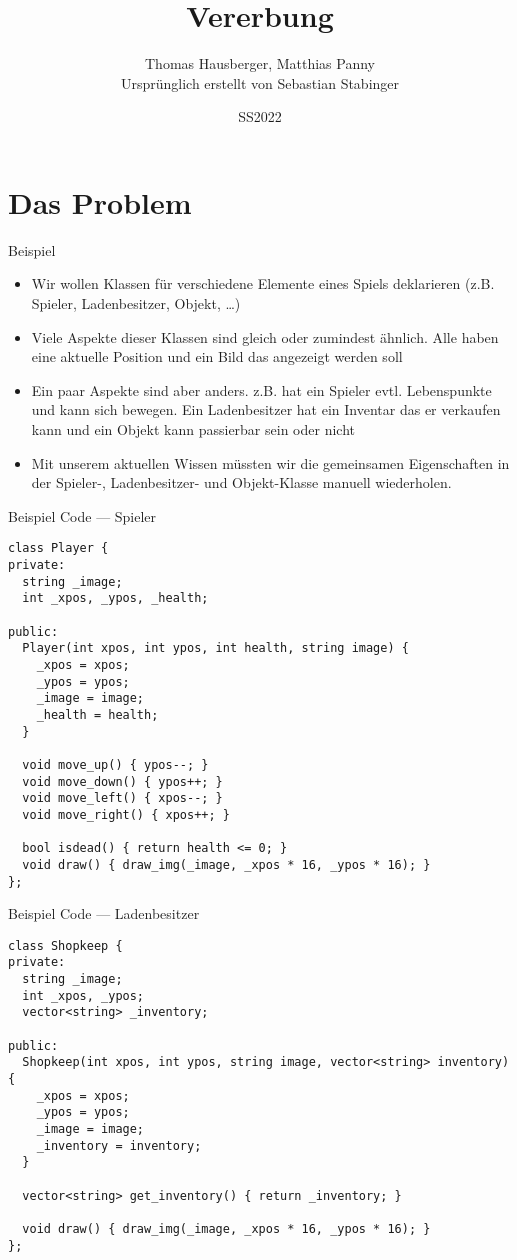 \documentclass[presentation]{beamer}
\author{Thomas Hausberger, Matthias Panny \\ Ursprünglich erstellt von Sebastian Stabinger}
\date{SS2022}
\title{Vererbung}
\begin{document}
\maketitle

\section{Das Problem}
\label{sec:orgf4ffd4a}
\begin{frame}[label={sec:org2c7cd86}]{Beispiel}
\begin{itemize}
\item Wir wollen Klassen für verschiedene Elemente eines Spiels
deklarieren (z.B. Spieler, Ladenbesitzer, Objekt, \ldots{})
\item Viele Aspekte dieser Klassen sind gleich oder zumindest ähnlich.
Alle haben eine aktuelle Position und ein Bild das angezeigt werden
soll
\item Ein paar Aspekte sind aber anders. z.B. hat ein Spieler evtl.
Lebenspunkte und kann sich bewegen. Ein Ladenbesitzer hat ein
Inventar das er verkaufen kann und ein Objekt kann passierbar sein
oder nicht
\item Mit unserem aktuellen Wissen müssten wir die gemeinsamen
Eigenschaften in der Spieler-, Ladenbesitzer- und Objekt-Klasse
manuell wiederholen.
\end{itemize}
\end{frame}
\begin{frame}[label={sec:org0486e86},fragile]{Beispiel Code --- Spieler}
 \begin{verbatim}
class Player {
private:
  string _image;
  int _xpos, _ypos, _health;

public:
  Player(int xpos, int ypos, int health, string image) {
    _xpos = xpos;
    _ypos = ypos;
    _image = image;
    _health = health;
  }

  void move_up() { ypos--; }
  void move_down() { ypos++; }
  void move_left() { xpos--; }
  void move_right() { xpos++; }

  bool isdead() { return health <= 0; }
  void draw() { draw_img(_image, _xpos * 16, _ypos * 16); }
};
\end{verbatim}
\end{frame}
\begin{frame}[label={sec:org48f000f},fragile]{Beispiel Code --- Ladenbesitzer}
 \begin{verbatim}
class Shopkeep {
private:
  string _image;
  int _xpos, _ypos;
  vector<string> _inventory;

public:
  Shopkeep(int xpos, int ypos, string image, vector<string> inventory) {
    _xpos = xpos;
    _ypos = ypos;
    _image = image;
    _inventory = inventory;
  }

  vector<string> get_inventory() { return _inventory; }

  void draw() { draw_img(_image, _xpos * 16, _ypos * 16); }
};
\end{verbatim}
\end{frame}
\end{document}
